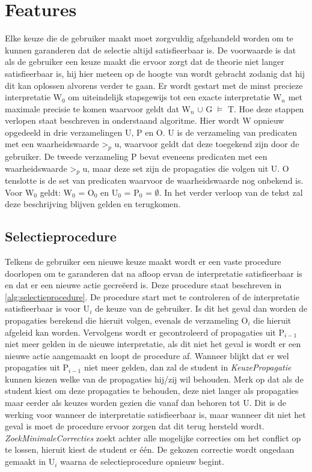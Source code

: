 \section{Features}
Elke keuze die de gebruiker maakt moet zorgvuldig afgehandeld worden om te kunnen garanderen dat de selectie altijd satisfieerbaar is. De voorwaarde is dat als de gebruiker een keuze maakt die ervoor zorgt dat de theorie niet langer satisfieerbaar is, hij hier meteen op de hoogte van wordt gebracht zodanig dat hij dit kan oplossen alvorens verder te gaan. Er wordt gestart met de minst precieze interpretatie W$_{0}$ om uiteindelijk stapsgewijs tot een exacte interpretatie W$_{n}$ met maximale precisie te komen waarvoor geldt dat W$_{n}$ $\cup$ G $\models$ T. Hoe deze stappen verlopen staat beschreven in onderstaand algoritme. Hier wordt W opnieuw opgedeeld in drie verzamelingen U, P en O. U is de verzameling van predicaten met een waarheidswaarde >$_{p}$ u, waarvoor geldt dat deze toegekend zijn door de gebruiker. De tweede verzameling P bevat eveneens predicaten met een waarheidswaarde >$_{p}$ u, maar deze set zijn de propagaties die volgen uit U. O tenslotte is de set van predicaten waarvoor de waarheidswaarde nog onbekend is. Voor W$_{0}$ geldt: W$_{0}$ = O$_{0}$ en U$_{0}$ = P$_{0}$ = $\emptyset$. In het verder verloop van de tekst zal deze beschrijving blijven gelden en terugkomen.

\subsection{Selectieprocedure}
Telkens de gebruiker een nieuwe keuze maakt wordt er een vaste procedure doorlopen om te garanderen dat na afloop ervan de interpretatie satisfieerbaar is en dat er een nieuwe actie gecre\"{e}erd is. Deze procedure staat beschreven in \ref{alg:selectieprocedure}. De procedure start met te controleren of de interpretatie satisfieerbaar is voor U$_{i}$ de keuze van de gebruiker. Is dit het geval dan worden de propagaties berekend die hieruit volgen, evenals de verzameling O$_{i}$ die hieruit afgeleid kan worden. Vervolgens wordt er gecontroleerd of  propagaties uit P$_{i-1}$ niet meer gelden in de nieuwe interpretatie, als dit niet het geval is wordt er een nieuwe actie aangemaakt en loopt de procedure af. Wanneer blijkt dat er wel propagaties uit P$_{i-1}$ niet meer gelden, dan zal de student in \textit{KeuzePropagatie} kunnen kiezen welke van de propagaties hij/zij wil behouden. Merk op dat als de student kiest om deze propagaties te behouden, deze niet langer als propagaties maar eerder als keuzes worden gezien die vanaf dan behoren tot U. Dit is de werking voor wanneer de interpretatie satisfieerbaar is, maar wanneer dit niet het geval is moet de procedure ervoor zorgen dat dit terug hersteld wordt. \textit{ZoekMinimaleCorrecties} zoekt achter alle mogelijke correcties om het conflict op te lossen, hieruit kiest de student er \'{e}\'{e}n. De gekozen correctie wordt ongedaan gemaakt in U$_{i}$ waarna de selectieprocedure opnieuw begint.

